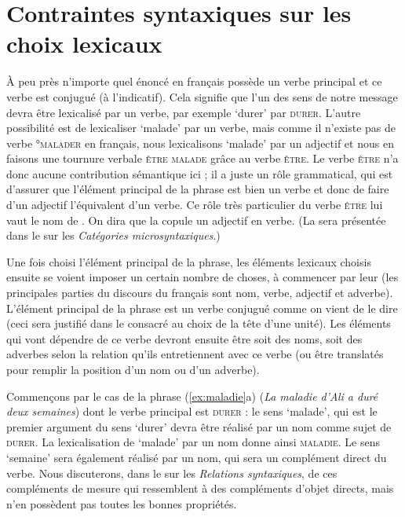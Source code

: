 \section{Contraintes syntaxiques sur les choix lexicaux}\label{sec:1.2.7}

À peu près n’importe quel énoncé en français possède un verbe principal et ce verbe est conjugué (à l'indicatif). Cela signifie que l’un des sens de notre message devra être lexicalisé par un verbe, par exemple ‘durer’ par \textsc{durer}. L’autre possibilité est de lexicaliser ‘malade’ par un verbe, mais comme il n’existe pas de verbe °\textsc{malader} en français, nous lexicalisons ‘malade’ par un adjectif et nous en faisons une tournure verbale \textsc{être} \textsc{malade} grâce au verbe \textsc{être}. Le verbe \textsc{être} n’a donc aucune contribution sémantique ici ; il a juste un rôle grammatical, qui est d’assurer que l’élément principal de la phrase est bien un verbe et donc de faire d’un adjectif l’équivalent d’un verbe. Ce rôle très particulier du verbe \textsc{être} lui vaut le nom de . On dira que la copule  un adjectif en verbe. (La  sera présentée dans le  sur les \textit{Catégories microsyntaxiques}.)

Une fois choisi l’élément principal de la phrase, les éléments lexicaux choisis ensuite se voient imposer un certain nombre de choses, à commencer par leur  (les principales parties du discours du français sont nom, verbe, adjectif et adverbe). L’élément principal de la phrase est un verbe conjugué comme on vient de le dire (ceci sera justifié dans le  consacré au choix de la tête d'une unité). Les éléments qui vont dépendre de ce verbe devront ensuite être soit des noms, soit des adverbes selon la relation qu’ils entretiennent avec ce verbe (ou être translatés pour remplir la position d'un nom ou d'un adverbe).

Commençons par le cas de la phrase (\ref{ex:maladie}a) (\textit{La maladie d’Ali a duré deux semaines}) dont le verbe principal est \textsc{durer} \textsc{:} le sens ‘malade’, qui est le premier argument du sens ‘durer’ devra être réalisé par un nom comme sujet de \textsc{durer}. La lexicalisation de ‘malade’ par un nom donne ainsi \textsc{maladie}. Le sens ‘semaine’ sera également réalisé par un nom, qui sera un complément direct du verbe. Nous discuterons, dans le  sur les \textit{Relations syntaxiques}, de ces compléments de mesure qui ressemblent à des compléments d’objet directs, mais n’en possèdent pas toutes les bonnes propriétés.

